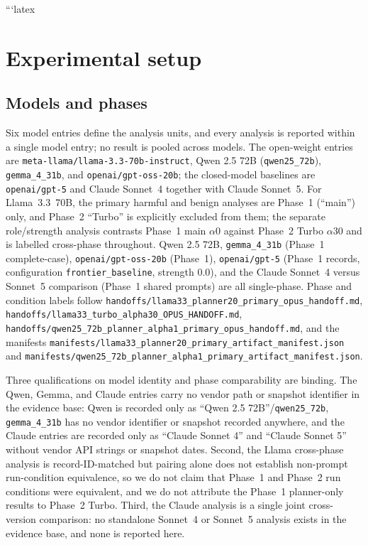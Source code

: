 ```latex
\section{Experimental setup}

\subsection{Models and phases}

Six model entries define the analysis units, and every analysis is reported
within a single model entry; no result is pooled across models. The open-weight
entries are \texttt{meta-llama/llama-3.3-70b-instruct}, Qwen 2.5 72B
(\texttt{qwen25\_72b}), \texttt{gemma\_4\_31b}, and
\texttt{openai/gpt-oss-20b}; the closed-model baselines are
\texttt{openai/gpt-5} and Claude Sonnet~4 together with Claude Sonnet~5.
For Llama~3.3~70B, the primary harmful and benign analyses are Phase~1
(``main'') only, and Phase~2 ``Turbo'' is explicitly excluded from them; the
separate role/strength analysis contrasts Phase~1 main $\alpha0$ against
Phase~2 Turbo $\alpha30$ and is labelled cross-phase throughout. Qwen 2.5 72B,
\texttt{gemma\_4\_31b} (Phase~1 complete-case), \texttt{openai/gpt-oss-20b}
(Phase~1), \texttt{openai/gpt-5} (Phase~1 records, configuration
\texttt{frontier\_baseline}, strength 0.0), and the Claude Sonnet~4 versus
Sonnet~5 comparison (Phase~1 shared prompts) are all single-phase. Phase and
condition labels follow
\texttt{handoffs/llama33\_planner20\_primary\_opus\_handoff.md},
\texttt{handoffs/llama33\_turbo\_alpha30\_OPUS\_HANDOFF.md},
\texttt{handoffs/qwen25\_72b\_planner\_alpha1\_primary\_opus\_handoff.md}, and
the manifests
\texttt{manifests/llama33\_planner20\_primary\_artifact\_manifest.json} and
\texttt{manifests/qwen25\_72b\_planner\_alpha1\_primary\_artifact\_manifest.json}.

Three qualifications on model identity and phase comparability are binding. The
Qwen, Gemma, and Claude entries carry no vendor path or snapshot identifier in
the evidence base: Qwen is recorded only as ``Qwen 2.5 72B''/\texttt{qwen25\_72b},
\texttt{gemma\_4\_31b} has no vendor identifier or snapshot recorded anywhere,
and the Claude entries are recorded only as ``Claude Sonnet 4'' and ``Claude
Sonnet 5'' without vendor API strings or snapshot dates. Second, the Llama
cross-phase analysis is record-ID-matched but pairing alone does not establish
non-prompt run-condition equivalence, so we do not claim that Phase~1 and
Phase~2 run conditions were equivalent, and we do not attribute the Phase~1
planner-only results to Phase~2 Turbo. Third, the Claude analysis is a single
joint cross-version comparison: no standalone Sonnet~4 or Sonnet~5 analysis
exists in the evidence base, and none is reported here.

